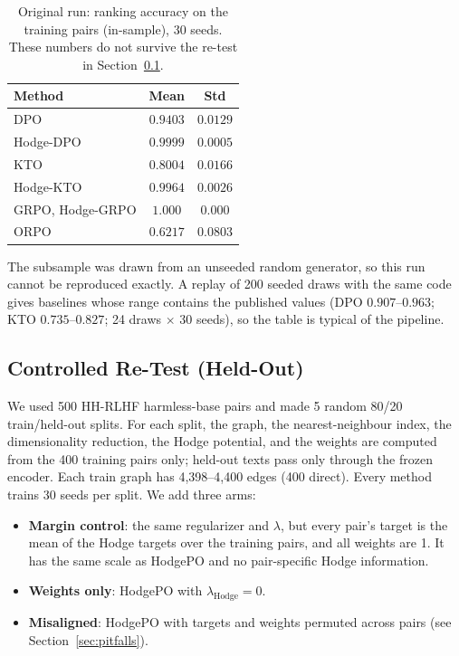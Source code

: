 \documentclass{article}
\begin{document}
\begin{table}[t]
\centering
\caption{Original run: ranking accuracy on the training pairs (in-sample), 30 seeds. These numbers do not survive the re-test in Section~\ref{sec:heldout}.}
\label{tab:original}
\vskip 0.1in
\begin{tabular}{@{}lcc@{}}
\toprule
\textbf{Method} & \textbf{Mean} & \textbf{Std} \\
\midrule
DPO & $0.9403$ & $0.0129$ \\
Hodge-DPO & $0.9999$ & $0.0005$ \\
KTO & $0.8004$ & $0.0166$ \\
Hodge-KTO & $0.9964$ & $0.0026$ \\
GRPO, Hodge-GRPO & $1.000$ & $0.000$ \\
ORPO & $0.6217$ & $0.0803$ \\
\bottomrule
\end{tabular}
\end{table}

The subsample was drawn from an unseeded random generator, so this run cannot be reproduced exactly. A replay of 200 seeded draws with the same code gives baselines whose range contains the published values (DPO $0.907$--$0.963$; KTO $0.735$--$0.827$; 24 draws $\times$ 30 seeds), so the table is typical of the pipeline.

\subsection{Controlled Re-Test (Held-Out)}
\label{sec:heldout}

We used 500 HH-RLHF harmless-base pairs and made 5 random 80/20 train/held-out splits. For each split, the graph, the nearest-neighbour index, the dimensionality reduction, the Hodge potential, and the weights are computed from the 400 training pairs only; held-out texts pass only through the frozen encoder. Each train graph has 4,398--4,400 edges (400 direct). Every method trains 30 seeds per split. We add three arms:
\begin{itemize}
    \item \textbf{Margin control}: the same regularizer and $\lambda$, but every pair's target is the mean of the Hodge targets over the training pairs, and all weights are 1. It has the same scale as HodgePO and no pair-specific Hodge information.
    \item \textbf{Weights only}: HodgePO with $\lambda_\text{Hodge} = 0$.
    \item \textbf{Misaligned}: HodgePO with targets and weights permuted across pairs (see Section~\ref{sec:pitfalls}).
\end{itemize}
\end{document}
